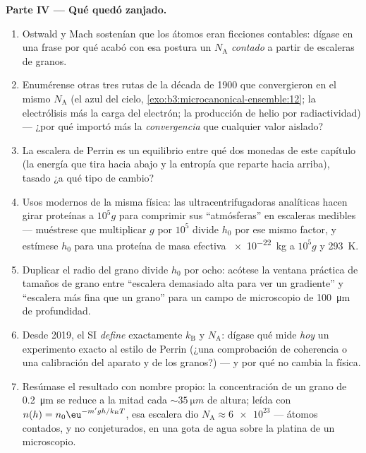 \begin{problem}
\medskip\noindent\textbf{Parte IV --- Qué quedó zanjado.}
\begin{enumerate}[resume]
  \item Ostwald y Mach sostenían que los átomos eran ficciones
        contables: dígase en una frase por qué acabó con esa postura un
        $N_{\text{A}}$ \emph{contado} a partir de escaleras de granos.
  \item Enumérense otras tres rutas de la década de 1900 que convergieron en
        el mismo $N_{\text{A}}$ (el azul del cielo,
        \cref{exo:b3:microcanonical-ensemble:12}; la electrólisis
        más la carga del electrón; la producción de helio por
        radiactividad) --- ¿por qué importó más la \emph{convergencia}
        que cualquier valor aislado?
  \item La escalera de Perrin es un equilibrio entre qué dos monedas de
        este capítulo (la energía que tira hacia abajo y la entropía que
        reparte hacia arriba), tasado ¿a qué tipo de cambio?
  \item Usos modernos de la misma física: las ultracentrifugadoras
        analíticas hacen girar proteínas a $10^5g$ para comprimir
        sus ``atmósferas'' en escaleras medibles --- muéstrese
        que multiplicar $g$ por $10^5$ divide $h_0$ por ese mismo
        factor, y estímese $h_0$ para una proteína de masa efectiva
        \qty{e-22}{kg} a $10^5g$ y \qty{293}{K}.
  \item Duplicar el radio del grano divide $h_0$ por ocho: acótese
        la ventana práctica de tamaños de grano entre ``escalera demasiado
        alta para ver un gradiente'' y ``escalera más fina que un
        grano'' para un campo de microscopio de \qty{100}{\micro m} de
        profundidad.
  \item Desde 2019, el SI \emph{define} exactamente $k_{\text{B}}$ y
        $N_{\text{A}}$: dígase qué mide \emph{hoy} un experimento exacto al
        estilo de Perrin (¿una comprobación de coherencia o una
        calibración del aparato y de los granos?) --- y por qué no cambia
        la física.
  \item Resúmase el resultado con nombre propio: la concentración de un
        grano de \qty{0.2}{\micro m} se reduce a la mitad cada
        $\sim\qty{35}{\micro m}$ de altura; leída con
        $n(h) = n_0\eu^{-m'gh/k_{\text{B}}T}$,
        esa escalera dio $N_{\text{A}} \approx \num{6e23}$ ---
        átomos contados, y no conjeturados, en una gota de agua sobre la
        platina de un microscopio.
\end{enumerate}
\end{problem}
